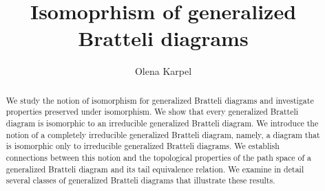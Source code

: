 \documentclass[11pt, twoside]{amsart}
\theoremstyle{definition}
\theoremstyle{remark}
\theoremstyle{plain}
\numberwithin{equation}{section}
\begin{document}
\title{Isomoprhism of generalized Bratteli diagrams}


\author{Olena Karpel}
\address{AGH University of Krakow, Faculty of Applied Mathematics, al. Adama Mickiewicza~30, 30-059 Krak\'ow, Poland \&
B. Verkin Institute for Low Temperature Physics and Engineering,
47~Nauky Ave., Kharkiv, 61103, Ukraine}






\date{}

\begin{abstract}


We study the notion of isomorphism for generalized Bratteli diagrams and investigate properties preserved under isomorphism. We show that every generalized Bratteli diagram is isomorphic to an irreducible generalized Bratteli diagram. We introduce the notion of a completely irreducible generalized Bratteli diagram, namely, a diagram that is isomorphic only to irreducible generalized Bratteli diagrams. We establish connections between this notion and the topological properties of the path space of a generalized Bratteli diagram and its tail equivalence relation. We examine in detail several classes of generalized Bratteli diagrams that illustrate these results.


\end{abstract}


\maketitle
\tableofcontents
\end{document}
